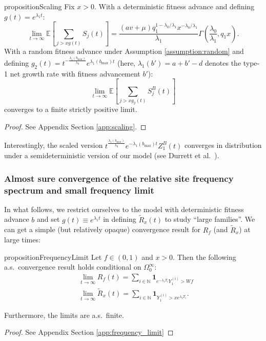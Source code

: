 \documentclass{article}
\numberwithin{equation}{section}
\begin{document}
\begin{restatable}{proposition}{Scaling}
  Fix $x>0$. With a deterministic fitness advance and defining $g(t)=e^{\lambda_1 t}$:
  \[\lim_{t\to\infty}\mathbb{E}\left[\sum_{j> xg(t)}S_j(t)\right]=\frac{(av+\mu) q_1^{1-\lambda_0/\lambda_1}x^{-\lambda_0/\lambda_1}}{\lambda_1}\Gamma(\frac{\lambda_0}{\lambda_1},q_1 x).\]
With a random fitness advance under Assumption \ref{assumption:random} and defining $g_2(t)=t^{-\frac{\lambda_1(b_{\max})}{\lambda_0}}e^{\lambda_1(b_{\max})t}$ (here, $\lambda_1(b')=a+b'-d$ denotes the type-1 net growth rate with fitness advancement $b'$):
  \[\lim_{t\to\infty}\mathbb{E}\left[\sum_{j> xg_2(t)}S_j^B(t)\right]\]
  converges to a finite strictly positive limit.\label{prop:scaling}
\end{restatable}
\begin{proof}
  See Appendix Section \ref{app:scaling}.
\end{proof}

Interestingly, the scaled version $t^{\frac{\lambda_1(b_{\max})}{\lambda_0}}e^{-\lambda_1(b_{\max})t}Z_1^{B}(t)$ converges in distribution under a semideterministic version of our model (see Durrett et al.~\cite{durrettfoo2010}). 

\subsubsection{Almost sure convergence of the relative site frequency spectrum and small frequency limit}\label{sec:convergence_relative_SFS}
In what follows, we restrict ourselves to the model with deterministic fitness advance $b$ and set $g(t)\equiv e^{\lambda_1 t}$ in defining $\widetilde{R}_x(t)$ to study ``large families''. 
We can get a simple (but relatively opaque) convergence result for $R_f$ (and $\widetilde{R}_x$) at large times:
\begin{restatable}{proposition}{FrequencyLimit}
  Let $f\in (0,1)$ and $x>0$. Then the following a.s.~convergence result holds conditional on $\Omega_0^\infty$:
  \begin{align}
    &\lim_{t\to\infty} R_f(t)=\sum_{i\in \mathbb{N}}\mathbf{1}_{e^{-\lambda_1 T_i}Y_1^{(i)}>Wf}\label{eq:frequency_limit}\\
    &\lim_{t\to\infty} \widetilde{R}_x(t)=\sum_{i\in \mathbb{N}}\mathbf{1}_{Y_1^{(i)}> xe^{\lambda_1 T_i}}.
  \end{align}

  Furthermore, the limits are a.s.~finite.\label{prop:frequency_limit}
\end{restatable}
\begin{proof}
  See Appendix Section \ref{app:frequency_limit}
\end{proof}
\end{document}
